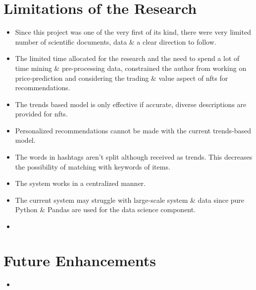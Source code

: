 \section{Limitations of the Research}
\begin{itemize}
\item Since this project was one of the very first of its kind, there were very limited number of scientific documents, data \& a clear direction to follow. 
\item  The limited time allocated for the research and the need to spend a lot of time mining \& pre-processing data, constrained the author from working on price-prediction and considering the trading \& value aspect of \gls{nft}s for recommendations.
\item The trends based model is only effective if accurate, diverse descriptions are provided for \gls{nft}s.
\item Personalized recommendations cannot be made with the current trends-based model.
\item The words in hashtags aren't split although received as trends. This decreases the possibility of matching with keywords of items.
\item The system works in a centralized manner.
\item The current system may struggle with large-scale system \& data since pure Python \& Pandas are used for the data science component.
\item %
\end{itemize}


\section{Future Enhancements}
\begin{itemize}
\item 
\end{itemize}


